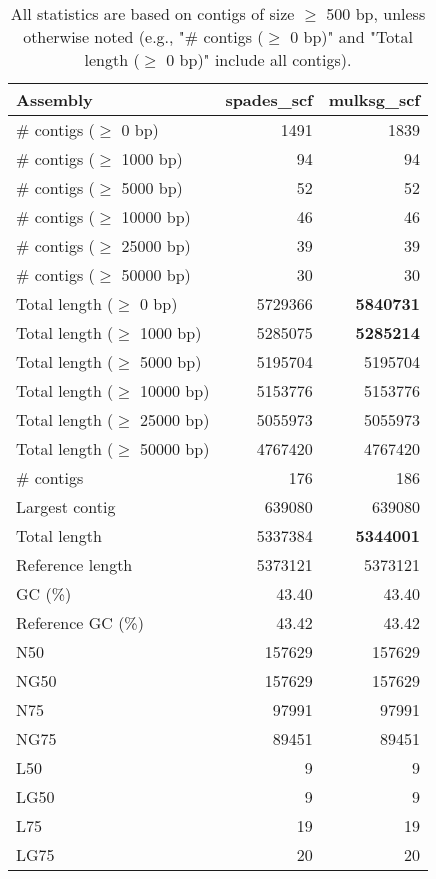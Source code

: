 \documentclass[12pt,a4paper]{article}
\begin{document}
\begin{table}[ht]
\begin{center}
\caption{All statistics are based on contigs of size $\geq$ 500 bp, unless otherwise noted (e.g., "\# contigs ($\geq$ 0 bp)" and "Total length ($\geq$ 0 bp)" include all contigs).}
\begin{tabular}{|l*{2}{|r}|}
\hline
Assembly & spades\_scf & mulksg\_scf \\ \hline
\# contigs ($\geq$ 0 bp) & 1491 & 1839 \\ \hline
\# contigs ($\geq$ 1000 bp) & 94 & 94 \\ \hline
\# contigs ($\geq$ 5000 bp) & 52 & 52 \\ \hline
\# contigs ($\geq$ 10000 bp) & 46 & 46 \\ \hline
\# contigs ($\geq$ 25000 bp) & 39 & 39 \\ \hline
\# contigs ($\geq$ 50000 bp) & 30 & 30 \\ \hline
Total length ($\geq$ 0 bp) & 5729366 & {\bf 5840731} \\ \hline
Total length ($\geq$ 1000 bp) & 5285075 & {\bf 5285214} \\ \hline
Total length ($\geq$ 5000 bp) & 5195704 & 5195704 \\ \hline
Total length ($\geq$ 10000 bp) & 5153776 & 5153776 \\ \hline
Total length ($\geq$ 25000 bp) & 5055973 & 5055973 \\ \hline
Total length ($\geq$ 50000 bp) & 4767420 & 4767420 \\ \hline
\# contigs & 176 & 186 \\ \hline
Largest contig & 639080 & 639080 \\ \hline
Total length & 5337384 & {\bf 5344001} \\ \hline
Reference length & 5373121 & 5373121 \\ \hline
GC (\%) & 43.40 & 43.40 \\ \hline
Reference GC (\%) & 43.42 & 43.42 \\ \hline
N50 & 157629 & 157629 \\ \hline
NG50 & 157629 & 157629 \\ \hline
N75 & 97991 & 97991 \\ \hline
NG75 & 89451 & 89451 \\ \hline
L50 & 9 & 9 \\ \hline
LG50 & 9 & 9 \\ \hline
L75 & 19 & 19 \\ \hline
LG75 & 20 & 20 \\ \hline

\end{tabular}
\end{center}
\end{table}
\end{document}
